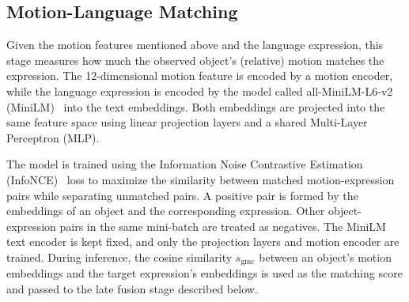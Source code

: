 \documentclass{article}
\begin{document}
\subsection{Motion-Language Matching}
\label{sec:align}
Given the motion features mentioned above and the language expression, this stage measures how much the observed object's (relative) motion matches the expression. The 12-dimensional motion feature is encoded by a motion encoder, while the language expression is encoded by the model called all-MiniLM-L6-v2 (MiniLM)~\cite{sbert} into the text embeddings. Both embeddings are projected into the same feature space using linear projection layers and a shared Multi-Layer Perceptron (MLP).

The model is trained using the Information Noise Contrastive Estimation (InfoNCE)~\cite{infonce} loss to maximize the similarity between matched motion-expression pairs while separating unmatched pairs. A positive pair is formed by the embeddings of an object and the corresponding expression. Other object-expression pairs in the same mini-batch are treated as negatives. The MiniLM text encoder is kept fixed, and only the projection layers and motion encoder are trained. During inference, the cosine similarity $s_{\mathrm{gmc}}$ between an object's motion embeddings and the target expression's embeddings is used as the matching score and passed to the late fusion stage described below.
\end{document}
